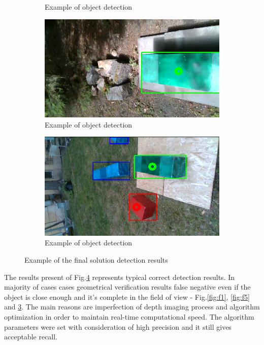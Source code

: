 \documentclass{ctuthesis}
\begin{document}
\begin{figure}[htbp]
\begin{subfigure}{0.475\textwidth}
         \caption{Example of object detection}
         \label{fig:f6}
     \end{subfigure}
    \hfill
     \begin{subfigure}{0.475\textwidth}
         \centering
         \includegraphics[width=\textwidth]{Fin_9.png}
         \caption{Example of object detection}
         \label{fig:f7}
     \end{subfigure}
                    \hfill
     \begin{subfigure}{0.475\textwidth}
         \centering
         \includegraphics[width=\textwidth]{Fin_10.png}
         \caption{Example of object detection}
         \label{fig:f8}
     \end{subfigure}
        \caption{Example of the final solution detection results}
        \label{fig:fus-alg}
\end{figure}

The results present of Fig.\ref{fig:fus-alg} represents typical correct detection results. In majority of cases cases geometrical verification results false negative even if the object is close enough and it's complete in the field of view - Fig.\ref{fig:f1}, \ref{fig:f5} and \ref{fig:f8}. The main reasons are imperfection of depth imaging process and algorithm optimization in order to maintain real-time computational speed. The algorithm parameters were set with consideration of high precision and it still gives acceptable recall.
\end{document}
